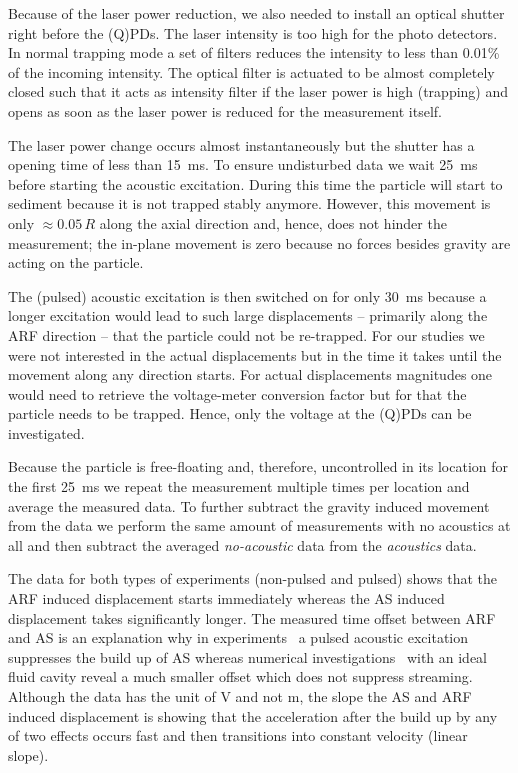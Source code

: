 Because of the laser power reduction, we also needed to install an optical 
shutter right before the (Q)PDs. The laser intensity is too high for the photo 
detectors. In normal trapping mode a set of filters reduces the intensity to 
less than 0.01\% of the incoming intensity. The optical filter is actuated to 
be almost completely closed such that it acts as intensity filter if the laser 
power is high (trapping) and opens as soon as the laser power is reduced for 
the measurement itself.

The laser power change occurs almost instantaneously but the shutter has a 
opening time of less than \SI{15}{\ms}. To ensure undisturbed data we wait 
\SI{25}{\ms} before starting the acoustic excitation. During this time the 
particle will start to sediment because it is not trapped stably anymore. 
However, this movement is only $\approx 0.05\,R$ along the axial direction and, 
hence, does not hinder the measurement; the in-plane movement is zero because 
no forces besides gravity are acting on the particle.

The (pulsed) acoustic excitation is then switched on for only \SI{30}{\ms} 
because a longer excitation would lead to such large displacements -- primarily 
along the ARF direction -- that the particle could not be re-trapped. For our 
studies we were not interested in the actual displacements but in the time it 
takes until the movement along any direction starts. For actual displacements 
magnitudes one would need to retrieve the voltage-meter conversion factor but 
for that the particle needs to be trapped. Hence, only the voltage at the 
(Q)PDs can be investigated.

Because the particle is free-floating and, therefore, uncontrolled in its 
location for the first \SI{25}{\ms} we repeat the measurement multiple times 
per location and average the measured data. To further subtract the gravity 
induced movement from the data we perform the same amount of measurements with 
no acoustics at all and then subtract the averaged \emph{no-acoustic} data from 
the \emph{acoustics} data.

The data for both types of experiments (non-pulsed and pulsed) shows that the 
ARF induced displacement starts immediately whereas the AS induced displacement 
takes significantly longer. The measured time offset between ARF and AS is an 
explanation why in experiments~\cite{Castro2016,Hoyos2013} a pulsed acoustic 
excitation suppresses the build up of AS whereas numerical 
investigations~\cite{Muller2015} with an ideal fluid cavity reveal a much 
smaller offset which does not suppress streaming. Although the data has the 
unit of \si{\volt} and not \si{\meter}, the slope the AS and ARF induced 
displacement is showing that the acceleration after the build up by any of two 
effects occurs fast and then transitions into constant velocity (linear slope). 

